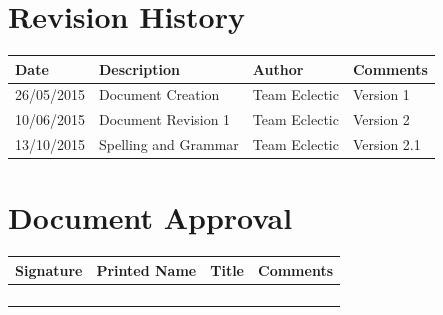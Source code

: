 \documentclass[11pt]{article}
\begin{document}


\setcounter{tocdepth}{3}
\setcounter{secnumdepth}{5}
\tableofcontents

\newpage
\section{Revision History}
\begin{table}[h]
\begin{tabular}{llll}
\textbf{Date}          & \textbf{Description}  & \textbf{Author}       & \textbf{Comments}   \\ \hline
\multicolumn{1}{|R{2cm}|}{26/05/2015} & \multicolumn{1}{L{4.5cm}|}{Document Creation} & \multicolumn{1}{l|}{Team Eclectic} & \multicolumn{1}{L{4cm}|}{Version 1} \\ \hline
\multicolumn{1}{|l|}{10/06/2015} & \multicolumn{1}{l|}{Document Revision 1} & \multicolumn{1}{l|}{Team Eclectic} & \multicolumn{1}{l|}{Version 2} \\ \hline
\multicolumn{1}{|l|}{13/10/2015} & \multicolumn{1}{l|}{Spelling and Grammar} & \multicolumn{1}{l|}{Team Eclectic} & \multicolumn{1}{l|}{Version 2.1} \\ \hline

\end{tabular}
\end{table}

\section{Document Approval}
\begin{table}[h]
\begin{tabular}{llll}
\textbf{Signature}     & \textbf{Printed Name} & \textbf{Title}        & \textbf{Comments}     \\ \hline
\multicolumn{1}{|l|}{} & \multicolumn{1}{L{3.5cm}|}{} & \multicolumn{1}{L{3.5cm}|}{} & \multicolumn{1}{L{4cm}|}{} \\ \hline
\multicolumn{1}{|l|}{} & \multicolumn{1}{l|}{} & \multicolumn{1}{l|}{} & \multicolumn{1}{l|}{} \\ \hline
\multicolumn{1}{|l|}{} & \multicolumn{1}{l|}{} & \multicolumn{1}{l|}{} & \multicolumn{1}{l|}{} \\ \hline
\multicolumn{1}{|l|}{} & \multicolumn{1}{l|}{} & \multicolumn{1}{l|}{} & \multicolumn{1}{l|}{} \\ \hline
\end{tabular}
\end{table}
\end{document}
